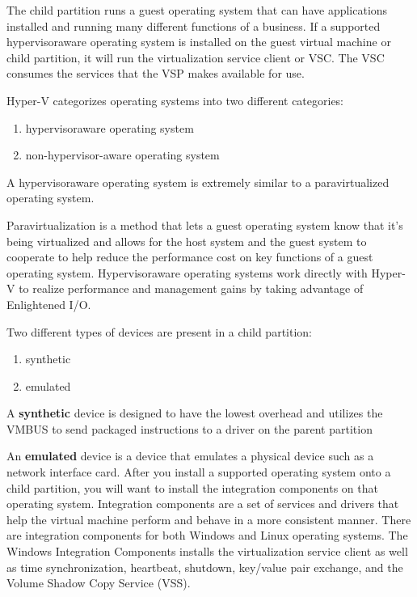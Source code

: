 The child partition \cite{BOOK:1} runs a guest operating system that can have applications installed and running many different functions of a business. If a supported hypervisoraware operating system is installed on the guest virtual machine or child partition, it will run the virtualization service client or VSC. The VSC consumes the services that the VSP makes available for use.

\vspace{5mm}

Hyper-V categorizes operating systems into two different categories:
\begin{enumerate}
	\item hypervisoraware operating system 
	\item non-hypervisor-aware operating system
\end{enumerate}

\vspace{5mm}

A hypervisoraware operating system is extremely similar to a paravirtualized operating system.

\vspace{5mm}

Paravirtualization is a method that lets a guest operating system know that it’s being virtualized and allows for the host system and the guest system to cooperate to help
reduce the performance cost on key functions of a guest operating system. Hypervisoraware operating systems work directly with Hyper-V to realize performance and management gains by taking advantage of Enlightened I/O.

\vspace{5mm}

Two different types of devices are present in a child partition:
\begin{enumerate}
	\item synthetic
	\item emulated
\end{enumerate}


A \textbf{synthetic} device is designed to have the lowest overhead and utilizes the VMBUS to send packaged instructions to a driver on the parent partition

\vspace{5mm}

An \textbf{emulated} device is a device that emulates a physical device such as a network interface card. After you install a supported operating system onto a child partition, 
you will want to install the integration components on that operating system. Integration components are a set of services and drivers that help the virtual machine perform and behave 
in a more consistent manner. There are integration components for both Windows and Linux operating systems. The Windows Integration Components installs the virtualization service client 
as well as time synchronization, heartbeat, shutdown, key/value pair exchange, and the Volume Shadow Copy Service (VSS).

